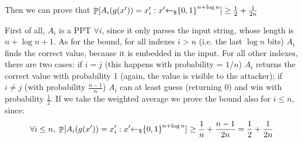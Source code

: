 \begin{enumerate}[(a)]
\begin{enumerate}[(i)]
\begin{solution}
			Then we can prove that $\mathop{\mathbb P}[A_i(g(x')) = x_i' : x' {\leftarrow_\$} {\{0, 1\}}^{n + \log{n}}] \ge \frac{1}{2} + \frac{1}{2n}$
			
			First of all, $A_i$ is a PPT $\forall i$, since it only parses the input string, whose length is $n + \log{n} + 1$.
			As for the bound, for all indexes $i > n$ (i.e. the last $\log{n}$ bits) $A_i$ finds the correct value, because it is embedded in the input.
			For all other indexes, there are two cases: if $i = j$ (this happens with probability = $1/n$) $A_i$ returns the correct value with probability 1 (again, the value is visible to the attacker); if $i \ne j$ (with probability $\frac{n-1}{n}$) $A_i$ can at least guess (returning 0) and win with probability $\frac{1}{2}$. If we take the weighted average we prove the bound also for $i \le n$, since:
			\[\forall i \le n,\; \mathop{\mathbb P}[A_i(g(x')) = x_i' : x' {\leftarrow_\$} {\{0, 1\}}^{n + \log{n}}] \ge \frac{1}{n} + \frac{n-1}{2n} = \frac{1}{2} + \frac{1}{2n} \]
		\end{solution}	
	\end{enumerate}
\end{enumerate}